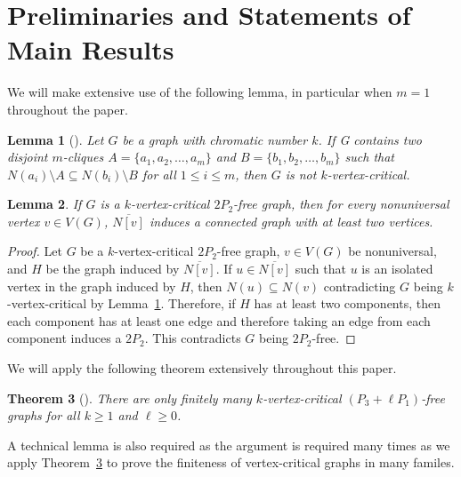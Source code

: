 \documentclass[11pt]{article}
\newtheorem{theorem}{Theorem}[section]
\newtheorem{lemma}[theorem]{Lemma}
\theoremstyle{definition}
\newcommand{\noneighbs}{\overline{N[v]}}
\begin{document}
\section{Preliminaries and Statements of Main Results}\label{sec:prelims}

We will make extensive use of the following lemma, in particular when $m=1$ throughout the paper.

\begin{lemma}[\cite{Hoang2015}]\label{lem:nocomparablecliques}
Let $G$ be a graph with chromatic number $k$. If G contains two disjoint $m$-cliques $A = \{a_1, a_2,\ldots , a_m\}$ and $B = \{b_1, b_2,\ldots , b_m\}$ such that $N(a_i) \setminus A \subseteq N(b_i) \setminus B$ for all $1 \le i \le m$, then $G$ is not $k$-vertex-critical.
\end{lemma}




\begin{lemma}\label{lem:2P2freenonneighbconnected}
If $G$ is a $k$-vertex-critical $2P_2$-free graph, then for every nonuniversal vertex $v\in V(G)$,  $\noneighbs$ induces a connected graph with at least two vertices.
\end{lemma}
\begin{proof}
Let $G$ be a $k$-vertex-critical $2P_2$-free graph, $v\in V(G)$ be nonuniversal, and $H$ be the graph induced by $\noneighbs$. If $u\in \noneighbs$ such that $u$ is an isolated vertex in the graph induced by $H$, then $N(u)\subseteq N(v)$ contradicting $G$ being $k$-vertex-critical by Lemma~\ref{lem:nocomparablecliques}. Therefore, if $H$ has at least two components, then each component has at least one edge and therefore taking an edge from each component induces a $2P_2$. This contradicts $G$ being $2P_2$-free. 
\end{proof}


We will apply the following theorem extensively throughout this paper.

\begin{theorem}[\cite{CameronHoangSawada2022}]\label{thm:finiteP3ellP1freecrit}
There are only finitely many $k$-vertex-critical $(P_3+\ell P_1)$-free graphs for all $k\ge 1$ and $\ell \ge 0$.
\end{theorem}



A technical lemma is also required as the argument is required many times as we apply Theorem~\ref{thm:finiteP3ellP1freecrit} to prove the finiteness of vertex-critical graphs in many familes.
\end{document}
